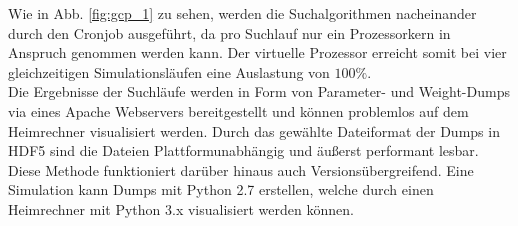 		Wie in Abb. \ref{fig:gcp_1} zu sehen, werden die Suchalgorithmen nacheinander durch den Cronjob ausgeführt, da pro Suchlauf nur ein Prozessorkern in Anspruch genommen werden kann. Der virtuelle Prozessor erreicht somit bei vier gleichzeitigen Simulationsläufen eine Auslastung von $100\%$.\\
		Die Ergebnisse der Suchläufe werden in Form von Parameter- und Weight-Dumps via eines Apache Webservers bereitgestellt und können problemlos auf dem Heimrechner visualisiert werden. Durch das gewählte Dateiformat der Dumps in HDF5 \cite{hdf5} sind die Dateien Plattformunabhängig und äußerst performant lesbar. Diese Methode funktioniert darüber hinaus auch Versionsübergreifend. Eine Simulation kann Dumps mit Python 2.7 erstellen, welche durch einen Heimrechner mit Python 3.x visualisiert werden können.

